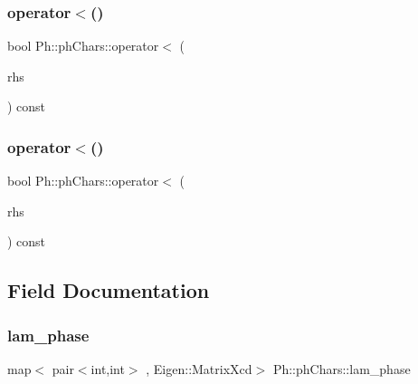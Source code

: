 \subsubsection{\texorpdfstring{operator$<$()}{operator<()}\hspace{0.1cm}{\footnotesize\ttfamily [1/2]}}
{\footnotesize\ttfamily bool Ph\+::ph\+Chars\+::operator$<$ (\begin{DoxyParamCaption}\item[{const \mbox{\hyperlink{structPh_1_1phChars}{ph\+Chars}} \&}]{rhs }\end{DoxyParamCaption}) const}

\mbox{\label{structPh_1_1phChars_af5b8755c7bff306b28edc0b5335e3541}} 
\subsubsection{\texorpdfstring{operator$<$()}{operator<()}\hspace{0.1cm}{\footnotesize\ttfamily [2/2]}}
{\footnotesize\ttfamily bool Ph\+::ph\+Chars\+::operator$<$ (\begin{DoxyParamCaption}\item[{const \mbox{\hyperlink{structPh_1_1phChars}{ph\+Chars}} \&}]{rhs }\end{DoxyParamCaption}) const}



\subsection{Field Documentation}
\mbox{\label{structPh_1_1phChars_aa49234e892635da38021b0dfeb359c31}} 
\subsubsection{\texorpdfstring{lam\_phase}{lam\_phase}\hspace{0.1cm}{\footnotesize\ttfamily [1/2]}}
{\footnotesize\ttfamily map$<$ pair$<$int,int$>$ , Eigen\+::\+Matrix\+Xcd$>$ Ph\+::ph\+Chars\+::lam\+\_\+phase}

\mbox{\label{structPh_1_1phChars_af79d4feac7df252a92fc9faf0500d214}} 
